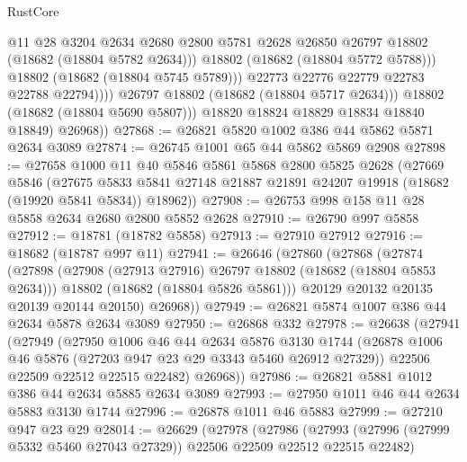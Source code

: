 \begin{lexlean}{RustCore}
\begin{coremodule}
                            @11
                            @28
                            @3204
                            @2634
                            @2680
                            @2800
                            @5781
                            @2628
                            @26850
                            @26797
                            @18802
                            (@18682 (@18804 @5782 @2634)))
                          @18802
                          (@18682 (@18804 @5772 @5788)))
                        @18802
                        (@18682 (@18804 @5745 @5789)))
                      @22773
                      @22776
                      @22779
                      @22783
                      @22788
                      @22794))))
              @26797
              @18802
              (@18682 (@18804 @5717 @2634)))
            @18802
            (@18682 (@18804 @5690 @5807)))
          @18820
          @18824
          @18829
          @18834
          @18840
          @18849)
        @26968))
@27868 := @26821 @5820 @1002 @386 @44 @5862 @5871 @2634 @3089
@27874 := @26745 @1001 @65 @44 @5862 @5869 @2908
@27898 := @27658
    @1000
    @11
    @40
    @5846
    @5861
    @5868
    @2800
    @5825
    @2628
    (@27669
      @5846
      (@27675 @5833 @5841 @27148 @21887 @21891 @24207 @19918 (@18682 (@19920 @5841 @5834)) @18962))
@27908 := @26753 @998 @158 @11 @28 @5858 @2634 @2680 @2800 @5852 @2628
@27910 := @26790 @997 @5858
@27912 := @18781 (@18782 @5858)
@27913 := @27910 @27912
@27916 := @18682 (@18787 @997 @11)
@27941 := @26646
    (@27860
      (@27868
        (@27874
          (@27898
            (@27908 (@27913 @27916) @26797 @18802 (@18682 (@18804 @5853 @2634)))
            @18802
            (@18682 (@18804 @5826 @5861)))
          @20129
          @20132
          @20135
          @20139
          @20144
          @20150)
        @26968))
@27949 := @26821 @5874 @1007 @386 @44 @2634 @5878 @2634 @3089
@27950 := @26868 @332
@27978 := @26638
    (@27941
      (@27949
        (@27950
          @1006
          @46
          @44
          @2634
          @5876
          @3130
          @1744
          (@26878 @1006 @46 @5876 (@27203 @947 @23 @29 @3343 @5460 @26912 @27329))
          @22506
          @22509
          @22512
          @22515
          @22482)
        @26968))
@27986 := @26821 @5881 @1012 @386 @44 @2634 @5885 @2634 @3089
@27993 := @27950 @1011 @46 @44 @2634 @5883 @3130 @1744
@27996 := @26878 @1011 @46 @5883
@27999 := @27210 @947 @23 @29
@28014 := @26629
    (@27978
      (@27986
        (@27993 (@27996 (@27999 @5332 @5460 @27043 @27329)) @22506 @22509 @22512 @22515 @22482)

\end{coremodule}
\end{lexlean}
